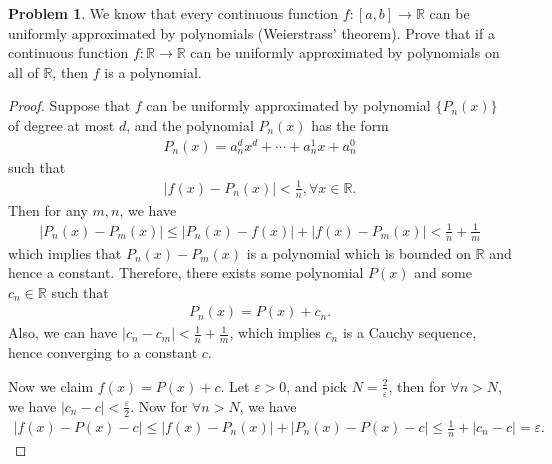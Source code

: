 \documentclass[11pt]{article}
\theoremstyle{definition}
\newtheorem{problem}{Problem}
\theoremstyle{definition}
\begin{document}
\begin{problem}
We know that every continuous function $f:[a,b]\to\mathbb{R}$ can be uniformly approximated by polynomials (Weierstrass' theorem). Prove that if
a continuous function $f:\mathbb{R}\to\mathbb{R}$ can be uniformly approximated by polynomials on all of $\mathbb{R}$, then $f$ is a polynomial. 
\end{problem}
\begin{proof}
Suppose that $f$ can be uniformly approximated by polynomial $\{P_n(x)\}$ of degree at most $d$, and the polynomial $P_n(x)$ has the form
\begin{align*}
    P_n(x) = a^d_n x^d + \cdots + a^1_n x + a^0_n
\end{align*}
such that 
\begin{align*}
    \left|f(x) - P_n(x)\right| < \frac{1}{n}, \forall x\in \mathbb{R}.
\end{align*}
Then for any $m,n$, we have
\begin{align*}
    \left|P_n(x) - P_m(x)\right| \leq \left|P_n(x) - f(x)\right| + \left|f(x) - P_m(x)\right| < \frac{1}{n} + \frac{1}{m}
\end{align*}
which implies that $P_n(x) - P_m(x)$ is a polynomial which is bounded on $\mathbb{R}$ and hence a constant. Therefore, there exists some polynomial $P(x)$ and some $c_n \in \mathbb{R}$ such that 
\begin{align*}
    P_n(x) = P(x) + c_n.
\end{align*}
Also, we can have $|c_n - c_m| < \frac{1}{n} + \frac{1}{m}$, which implies $c_n$ is a Cauchy sequence, hence converging to a constant $c$.

Now we claim $f(x) = P(x) + c$. Let $\varepsilon > 0$, and pick $N = \frac{2}{\varepsilon}$, then for $\forall n > N$, we have $|c_n - c| < \frac{\varepsilon}{2}$. Now for $\forall n > N$, we have 
\begin{align*}
    |f(x) - P(x) - c| \leq |f(x) - P_n(x)| + |P_n(x) - P(x) - c| \leq \frac{1}{n} + |c_n - c| = \varepsilon.
\end{align*}
\end{proof}

\medskip
\end{document}
